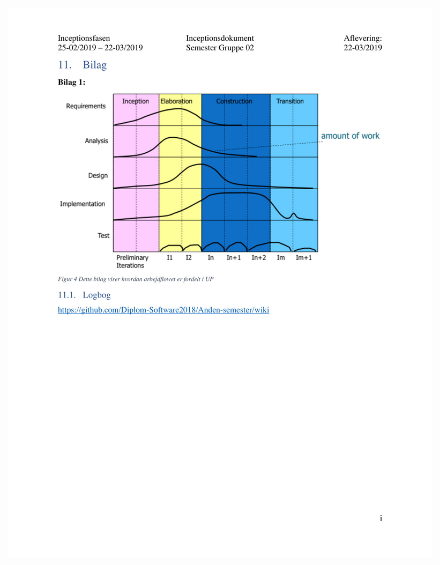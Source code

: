 \begin{figure}[hb]
  \includegraphics[scale = 0.33]{./PNG/Inceptions/Gruppe02+InceptionsDokument-34.jpg} 
\end{figure}


